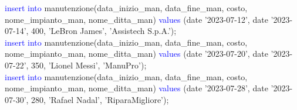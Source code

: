 \documentclass{article}
\begin{document}
\begin{flushleft}
{        \vspace{2mm}
        \hspace*{0.5em}\textcolor{blue}{insert into} manutenzione(data\_inizio\_man, data\_fine\_man, costo, \hspace*{0.5em}nome\_impianto\_man, nome\_ditta\_man) \textcolor{blue}{values} (date '2023-07-12', date '2023-07-14', \hspace*{0.5em}400, 'LeBron James', 'Assistech S.p.A.'); \\
        \vspace{2mm}
        \hspace*{0.5em}\textcolor{blue}{insert into} manutenzione(data\_inizio\_man, data\_fine\_man, costo, \hspace*{0.5em}nome\_impianto\_man, nome\_ditta\_man) \textcolor{blue}{values} (date '2023-07-20', date '2023-07-22', \hspace*{0.5em}350, 'Lionel Messi', 'ManuPro'); \\
        \vspace{2mm}
        \hspace*{0.5em}\textcolor{blue}{insert into} manutenzione(data\_inizio\_man, data\_fine\_man, costo, \hspace*{0.5em}nome\_impianto\_man, nome\_ditta\_man) \textcolor{blue}{values} (date '2023-07-28', date '2023-07-30', \hspace*{0.5em}280, 'Rafael Nadal', 'RiparaMigliore'); \\
        \vspace{2mm}}
    \end{flushleft}
\end{document}
